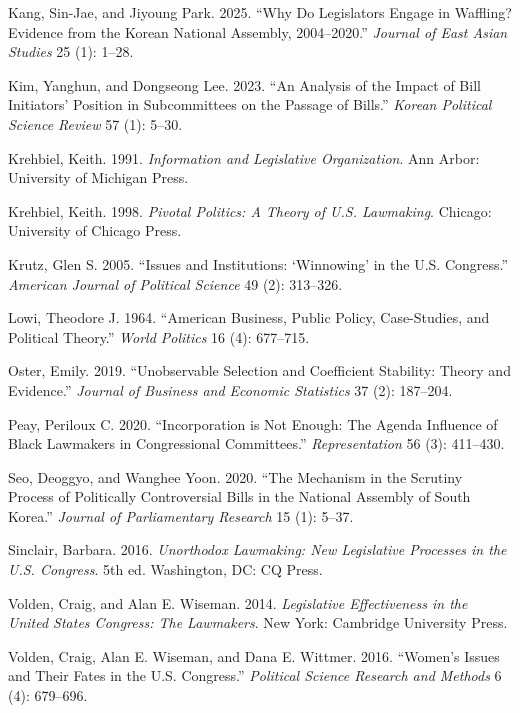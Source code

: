 \documentclass[11pt]{article}
\begin{document}
\begin{description}
\item Kang, Sin-Jae, and Jiyoung Park. 2025. ``Why Do Legislators Engage in Waffling? Evidence from the Korean National Assembly, 2004--2020.'' \textit{Journal of East Asian Studies} 25 (1): 1--28.

\item Kim, Yanghun, and Dongseong Lee. 2023. ``An Analysis of the Impact of Bill Initiators' Position in Subcommittees on the Passage of Bills.'' \textit{Korean Political Science Review} 57 (1): 5--30.

\item Krehbiel, Keith. 1991. \textit{Information and Legislative Organization}. Ann Arbor: University of Michigan Press.

\item Krehbiel, Keith. 1998. \textit{Pivotal Politics: A Theory of U.S. Lawmaking}. Chicago: University of Chicago Press.

\item Krutz, Glen S. 2005. ``Issues and Institutions: `Winnowing' in the U.S. Congress.'' \textit{American Journal of Political Science} 49 (2): 313--326.

\item Lowi, Theodore J. 1964. ``American Business, Public Policy, Case-Studies, and Political Theory.'' \textit{World Politics} 16 (4): 677--715.

\item Oster, Emily. 2019. ``Unobservable Selection and Coefficient Stability: Theory and Evidence.'' \textit{Journal of Business and Economic Statistics} 37 (2): 187--204.

\item Peay, Periloux C. 2020. ``Incorporation is Not Enough: The Agenda Influence of Black Lawmakers in Congressional Committees.'' \textit{Representation} 56 (3): 411--430.

\item Seo, Deoggyo, and Wanghee Yoon. 2020. ``The Mechanism in the Scrutiny Process of Politically Controversial Bills in the National Assembly of South Korea.'' \textit{Journal of Parliamentary Research} 15 (1): 5--37.

\item Sinclair, Barbara. 2016. \textit{Unorthodox Lawmaking: New Legislative Processes in the U.S. Congress}. 5th ed. Washington, DC: CQ Press.

\item Volden, Craig, and Alan E. Wiseman. 2014. \textit{Legislative Effectiveness in the United States Congress: The Lawmakers}. New York: Cambridge University Press.

\item Volden, Craig, Alan E. Wiseman, and Dana E. Wittmer. 2016. ``Women's Issues and Their Fates in the U.S. Congress.'' \textit{Political Science Research and Methods} 6 (4): 679--696.

\end{description}
\end{document}
